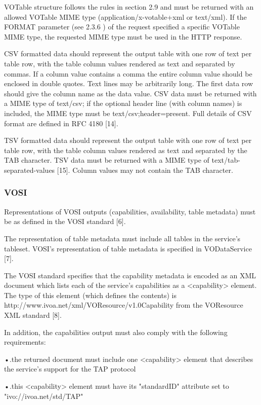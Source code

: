 \documentclass[11pt,a4paper]{ivoa}
\begin{document}
VOTable structure follows the rules in section 2.9 and must be returned with an 
allowed VOTable MIME type (application/x-votable+xml or text/xml). If the FORMAT 
parameter (see 2.3.6 ) of the request specified a specific VOTable MIME type, 
the requested MIME type must be used in the HTTP response.

CSV formatted data should represent the output table with one row of text per 
table row, with the table column values rendered as text and separated by 
commas. If a column value contains a comma the entire column value should be 
enclosed in double quotes.  Text lines may be arbitrarily long.  The first data 
row should give the column name as the data value.   CSV data must be returned 
with a MIME type of text/csv; if the optional header line (with column names) is 
included, the MIME type must be text/csv;header=present. Full details of CSV 
format are defined in RFC 4180 [14].

TSV formatted data should represent the output table with one row of text per 
table row, with the table column values rendered as text and separated by the 
TAB character. TSV data must be returned with a MIME type of 
text/tab-separated-values [15]. Column values may not contain the TAB 
character. 

\subsubsection{VOSI}
Representations of VOSI outputs (capabilities, availability, table metadata) 
must be as defined in the VOSI standard [6].

The representation of table metadata must include all tables in the service's 
tableset. VOSI's representation of table metadata is specified in VODataService 
[7].

The VOSI standard specifies that the capability metadata is encoded as an XML 
document which lists each of the service's capabilities as a <capability> 
element. The type of this element (which defines the contents) is 
{http://www.ivoa.net/xml/VOResource/v1.0}Capability from the VOResource XML 
standard [8].

In addition, the capabilities output must also comply with the following    
requirements:

    •.the returned document must include one <capability> element that describes 
the service's support for the TAP protocol 

    •.this <capability> element must have its "standardID" attribute set to 
"ivo://ivoa.net/std/TAP" 
\end{document}
